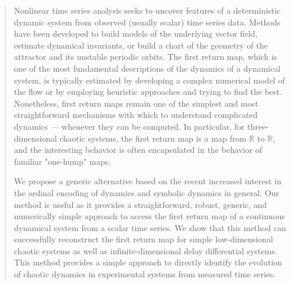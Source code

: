 \documentclass[%
 aip,
 amsmath,amssymb,
 reprint,%
]{revtex4-1}
\begin{document}
\maketitle

\begin{quotation}
Nonlinear time series analysis seeks to uncover features of a deterministic dynamic system from observed (usually scalar) time series data. Methods have been developed to build models of the underlying vector field, estimate dynamical invariants, or build a chart of the geometry of the attractor and its unstable periodic orbits. The first return map, which is one of the most fundamental descriptions of the dynamics of a dynamical system, is typically estimated by developing a complex numerical model of the flow or by employing heuristic approaches and trying to find the best. Nonetheless, first return maps remain one of the simplest and most straightforward mechanisms with which to understand complicated dynamics --- whenever they can be computed. In particular, for three-dimensional chaotic systems, the first return map is a map from $\mathbb{R}$ to $\mathbb{R}$, and the interesting behavior is often encapsulated in the behavior of familiar "one-hump" maps.

We propose a generic alternative based on the recent increased interest in the ordinal encoding of dynamics and symbolic dynamics in general. Our method is useful as it provides a straightforward, robust, generic, and numerically simple approach to access the first return map of a continuous dynamical system from a scalar time series. We show that this method can successfully reconstruct the first return map for simple low-dimensional chaotic systems as well as infinite-dimensional delay differential systems. This method provides a simple approach to directly identify the evolution of chaotic dynamics in experimental systems from measured time series. 


\end{quotation}
\end{document}
